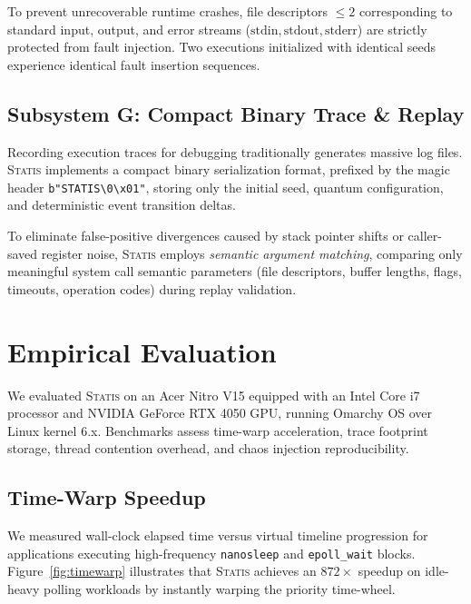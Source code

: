 \documentclass[twocolumn,10pt,sigconf,nonacm]{acmart}
\begin{document}
To prevent unrecoverable runtime crashes, file descriptors $\le 2$ corresponding to standard input, output, and error streams ($\text{stdin}, \text{stdout}, \text{stderr}$) are strictly protected from fault injection. Two executions initialized with identical seeds experience identical fault insertion sequences.

\subsection{Subsystem G: Compact Binary Trace \& Replay}
Recording execution traces for debugging traditionally generates massive log files. \textsc{Statis} implements a compact binary serialization format, prefixed by the magic header \texttt{b"STATIS\textbackslash 0\textbackslash x01"}, storing only the initial seed, quantum configuration, and deterministic event transition deltas.

To eliminate false-positive divergences caused by stack pointer shifts or caller-saved register noise, \textsc{Statis} employs \textit{semantic argument matching}, comparing only meaningful system call semantic parameters (file descriptors, buffer lengths, flags, timeouts, operation codes) during replay validation.

\section{Empirical Evaluation}

We evaluated \textsc{Statis} on an Acer Nitro V15 equipped with an Intel Core i7 processor and NVIDIA GeForce RTX 4050 GPU, running Omarchy OS over Linux kernel 6.x. Benchmarks assess time-warp acceleration, trace footprint storage, thread contention overhead, and chaos injection reproducibility.

\subsection{Time-Warp Speedup}
We measured wall-clock elapsed time versus virtual timeline progression for applications executing high-frequency \texttt{nanosleep} and \texttt{epoll\_wait} blocks. Figure~\ref{fig:timewarp} illustrates that \textsc{Statis} achieves an $872\times$ speedup on idle-heavy polling workloads by instantly warping the priority time-wheel.
\end{document}
